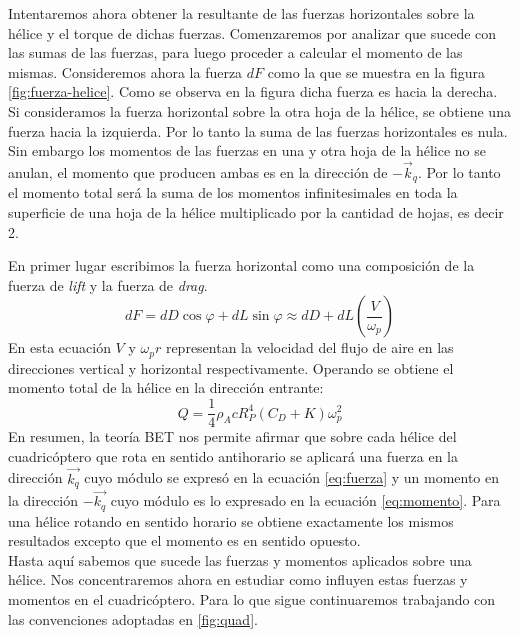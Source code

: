 \documentclass[main]{subfiles}
\begin{document}
Intentaremos ahora obtener la resultante de las fuerzas horizontales sobre la h\'elice y el torque de dichas fuerzas. Comenzaremos por analizar que sucede con las sumas de las fuerzas, para luego proceder a calcular el momento de las mismas. Consideremos ahora la fuerza $dF$ como la que se muestra en la figura \ref{fig:fuerza-helice}. Como se observa en la figura dicha fuerza es hacia la derecha. Si consideramos la fuerza horizontal sobre la otra hoja de la h\'elice, se obtiene una fuerza hacia la izquierda. Por lo tanto la suma de las fuerzas horizontales es nula. Sin embargo los momentos de las fuerzas en una y otra hoja de la h\'elice no se anulan, el momento que producen ambas es en la direcci\'on de $-\vec{k}_q$. Por lo tanto el momento total ser\'a la suma de los momentos infinitesimales en toda la superficie de una hoja de la h\'elice multiplicado por la cantidad de hojas, es decir 2. 

En primer lugar escribimos la fuerza horizontal como una composici\'on de la fuerza de \emph{lift} y la fuerza de \emph{drag}. 
\begin{equation}
dF=dD\cos\varphi+dL\sin\varphi \approx dD +dL\left(\frac{V}{\omega_p}\right)
\end{equation} 
En esta ecuaci\'on $V$ y $\omega_p r$ representan la velocidad del flujo de aire en las direcciones vertical y horizontal respectivamente. Operando se obtiene el momento total de la h\'elice en la direcci\'on entrante:
\begin{equation}
\label{eq:momento}
Q=\frac{1}{4}\rho_A c R_P^4(C_D+K)\omega_p^2
\end{equation}
En resumen, la teor\'ia BET nos permite afirmar que sobre cada h\'elice del cuadric\'optero que rota en sentido antihorario se aplicar\'a una fuerza en la direcci\'on $\vec{k_q}$ cuyo m\'odulo se expres\'o en la ecuaci\'on \ref{eq:fuerza} y un momento en la direcci\'on $-\vec{k_q}$ cuyo m\'odulo es lo expresado en la ecuaci\'on \ref{eq:momento}. Para una h\'elice rotando en sentido horario se obtiene exactamente los mismos resultados excepto que el momento es en sentido opuesto.\\

Hasta aqu\'i sabemos que sucede las fuerzas y momentos aplicados sobre una h\'elice. Nos concentraremos ahora en estudiar como influyen estas fuerzas y momentos en el cuadric\'optero. Para lo que sigue continuaremos trabajando con las convenciones adoptadas en \ref{fig:quad}. 
 
\end{document}
